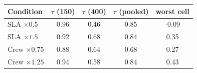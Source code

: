 \begin{tabular}{lcccc}
\toprule
Condition & $\tau$ (150) & $\tau$ (400) & $\tau$ (pooled) & worst cell \\
\midrule
SLA $\times0.5$ & 0.96 & 0.46 & 0.85 & -0.09 \\
SLA $\times1.5$ & 0.92 & 0.68 & 0.84 & 0.35 \\
Crew $\times0.75$ & 0.88 & 0.64 & 0.68 & 0.27 \\
Crew $\times1.25$ & 0.94 & 0.58 & 0.84 & 0.43 \\
\bottomrule
\end{tabular}
